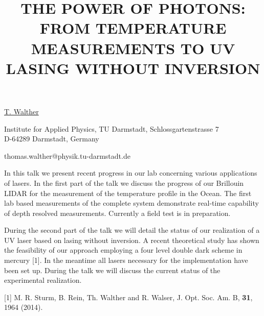 \title{THE POWER OF PHOTONS: FROM TEMPERATURE MEASUREMENTS TO UV LASING WITHOUT INVERSION}

\underline{T. Walther} 

{\normalsize{\vspace{-4mm}
Institute for Applied Physics, TU Darmstadt, Schlossgartenstrasse 7\\
D-64289 Darmstadt, Germany

\email thomas.walther@physik.tu-darmstadt.de}}

In this talk we present recent progress in our lab concerning various applications of lasers. In the first part of the talk we discuss the progress of our Brillouin LIDAR  for the measurement of the temperature profile in the Ocean. The first lab based measurements of the complete system demonstrate real-time capability of depth resolved measurements. Currently a field test is in preparation.

During the second part of the talk we will detail the status of our realization of a UV laser based on lasing without inversion. A recent theoretical study has shown the feasibility of our approach employing a four level double dark scheme  in mercury [1]. In the meantime all lasers necessary for the implementation have been set up.  During the talk we will discuss the current status of the experimental realization.

{\normalsize
[1] M. R. Sturm, B. Rein, Th. Walther and R. Walser, J. Opt. Soc. Am. B, \textbf{31}, 1964 (2014).
}

\vspace{\baselineskip}
